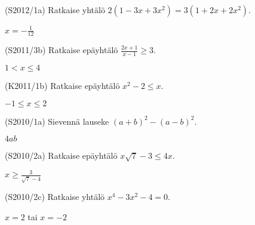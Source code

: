 \begin{tehtava}
(S2012/1a) Ratkaise yhtälö $2(1-3x+3x^2) = 3(1+2x+2x^2)$.
\begin{vastaus}
$x=-\frac{1}{12}$
\end{vastaus}
\end{tehtava}


\begin{tehtava}
  (S2011/3b) Ratkaise epäyhtälö $\frac{2x+1}{x-1} \geq 3$.
\begin{vastaus}
$1<x \leq 4$
\end{vastaus}
\end{tehtava}

\begin{tehtava}
(K2011/1b) Ratkaise epäyhtälö $x^2-2 \leq x$.
\begin{vastaus}
$-1 \leq x \leq 2$
\end{vastaus}
\end{tehtava}

\begin{tehtava}
(S2010/1a) Sievennä lauseke $(a+b)^2-(a-b)^2$.
\begin{vastaus}
$4ab$
\end{vastaus}
\end{tehtava}

\begin{tehtava}
(S2010/2a) Ratkaise epäyhtälö $x\sqrt{7}-3 \leq 4x$.
\begin{vastaus}
$x \geq \frac{3}{\sqrt{7}-4}$
\end{vastaus}
\end{tehtava}

\begin{tehtava}
(S2010/2c) Ratkaise yhtälö $x^4-3x^2-4=0$.
\begin{vastaus}
$x=2$ tai $x=-2$
\end{vastaus}
\end{tehtava}



